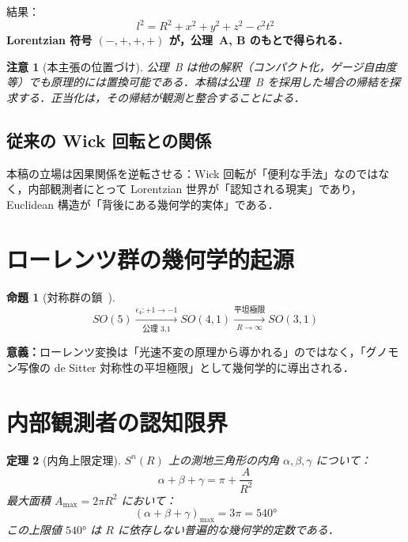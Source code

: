 \documentclass[12pt,a4paper]{ltjsarticle}
\newtheorem{theorem}{定理}[section]
\newtheorem{proposition}[theorem]{命題}
\newtheorem*{remark}{注意}
\begin{document}
結果：
\begin{equation}
l^2 = R^2 + x^2 + y^2 + z^2 - c^2t^2 \tag{3.3}
\end{equation}
\textbf{Lorentzian 符号 $(-,+,+,+)$ が，公理~A, B のもとで得られる．}

\begin{remark}[本主張の位置づけ]
公理~B は他の解釈（コンパクト化，ゲージ自由度等）でも原理的には置換可能である．本稿は公理~B を採用した場合の帰結を探求する．正当化は，その帰結が観測と整合することによる．
\end{remark}

\subsection{従来の Wick 回転との関係}

本稿の立場は因果関係を逆転させる：Wick 回転が「便利な手法」なのではなく，内部観測者にとって Lorentzian 世界が「認知される現実」であり，Euclidean 構造が「背後にある幾何学的実体」である．

\section{ローレンツ群の幾何学的起源}

\begin{proposition}[対称群の鎖~{\normalfont\cite{Wald1984,Guo2004}}]\label{prop:chain}
\begin{equation}
SO(5) \xrightarrow[\text{公理~3.1}]{\epsilon_4: +1 \to -1} SO(4,1) \xrightarrow[R \to \infty]{\text{平坦極限}} SO(3,1) \tag{4.1}
\end{equation}
\end{proposition}

\textbf{意義：}ローレンツ変換は「光速不変の原理から導かれる」のではなく，「グノモン写像の de Sitter 対称性の平坦極限」として幾何学的に導出される．

\section{内部観測者の認知限界}

\begin{theorem}[内角上限定理]\label{thm:angle}
$S^n(R)$ 上の測地三角形の内角 $\alpha, \beta, \gamma$ について：
\begin{equation}
\alpha + \beta + \gamma = \pi + \frac{A}{R^2} \tag{5.1}
\end{equation}
最大面積 $A_{\max} = 2\pi R^2$ において：
\begin{equation}
(\alpha + \beta + \gamma)_{\max} = 3\pi = 540° \tag{5.2}
\end{equation}
この上限値 $540°$ は $R$ に依存しない普遍的な幾何学的定数である．
\end{theorem}
\end{document}
